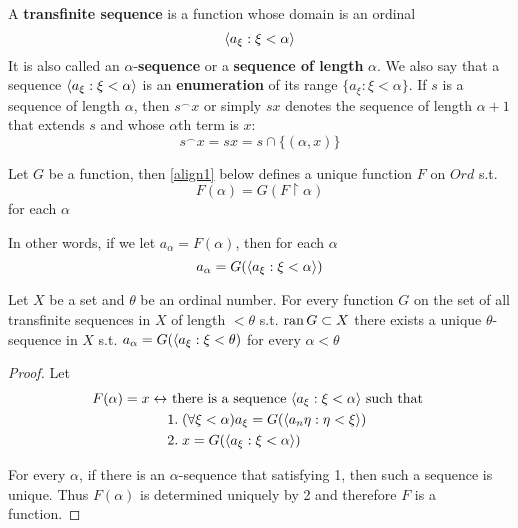\documentclass[11pt]{article}
\begin{document}
A \textbf{transfinite sequence} is a function whose domain is an ordinal
\begin{equation*}
\langle a_\xi:\xi<\alpha\rangle
\end{equation*}
It is also called an \(\alpha\)-\textbf{sequence} or a \textbf{sequence of length}
\(\alpha\). We also say that a sequence \(\langle a_\xi:\xi<\alpha\rangle\) is an
\textbf{enumeration} of its range \(\{a_\xi:\xi<\alpha\}\). If \(s\) is a sequence of
length \(\alpha\), then \(s^\smallfrown x\) or simply \(sx\) denotes the sequence of length
\(\alpha+1\) that extends \(s\) and whose \(\alpha\)th term is \(x\):
\begin{equation*}
s^\smallfrown x=sx=s\cap\{(\alpha,x)\}
\end{equation*}

\begin{theorem}
Let \(G\) be a function, then \ref{align1} below defines a unique function \(F\) on
\(Ord\) s.t.
\begin{equation*}
F(\alpha)=G(F\restriction\alpha)
\end{equation*}
for each \(\alpha\)
\end{theorem}
In other words, if we let \(a_\alpha=F(\alpha)\), then for each \(\alpha\)
\begin{equation*}
a_\alpha=G(\langle a_\xi:\xi<\alpha\rangle)
\end{equation*}

\begin{corollary}[]
Let \(X\) be a set and \(\theta\) be an ordinal number. For every function \(G\) on
the set of all transfinite sequences in \(X\) of length \(<\theta\) s.t.
\(\operatorname{ran}{G}\subset X\) there exists a unique \(\theta\)-sequence in \(X\) s.t. 
\(a_\alpha=G(\langle a_\xi:\xi<\theta)\) for every \(\alpha<\theta\)
\end{corollary}
\begin{proof}

Let
\begin{align}
\label{align1}
F(\alpha)=x\leftrightarrow&\text{ there is a sequence }
\langle a_\xi:\xi<\alpha\rangle \text{ such that }\\
&1.\;(\forall \xi<\alpha)a_\xi=G(\langle a_n\eta:\eta<\xi\rangle)\nonumber \\
&2.\; x=G(\langle a_\xi:\xi<\alpha\rangle)\nonumber
\end{align}

For every \(\alpha\), if there is an \(\alpha\)-sequence that satisfying 1, then such
a sequence is unique. Thus \(F(\alpha)\) is determined uniquely by 2 and
therefore \(F\) is a function. 
\end{proof}
\end{document}
